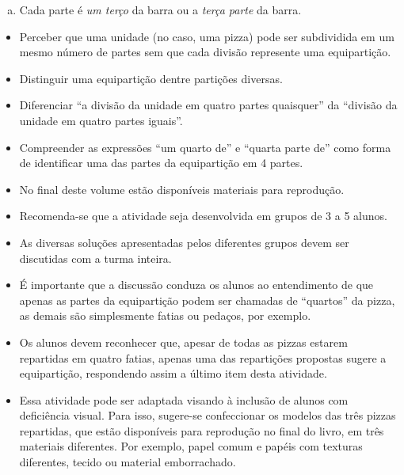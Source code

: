 \begin{multicols}{2}
\begin{solucao}{}{}
\begin{enumerate}[a),wide,labelindent=0pt]
    \item       Cada parte é {\it um terço} da barra ou a {\it terça parte} da barra.
\end{enumerate} %
\end{solucao}


\begin{objetivos}{}{}
\begin{itemize} %
    \item       Perceber que uma unidade (no caso, uma pizza) pode ser subdividida em um mesmo número de partes sem que cada divisão represente uma equipartição.
    \item       Distinguir uma equipartição dentre partições diversas.
    \item       Diferenciar       ``a divisão da unidade em quatro partes quaisquer'' da       ``divisão da unidade em quatro partes iguais''.
    \item       Compreender as expressões ``um quarto de'' e ``quarta parte de'' como forma de identificar uma das partes da equipartição em 4 partes.
\end{itemize} %
\end{objetivos}

\begin{orientacoes}
  \begin{itemize} %
    \item No final deste volume estão disponíveis materiais para reprodução.
    \item Recomenda-se que a atividade seja desenvolvida em grupos de 3 a 5 alunos.
    \item As diversas soluções apresentadas pelos diferentes grupos devem ser discutidas com a turma inteira.
    \item É importante que a discussão conduza os alunos ao entendimento de que apenas as partes da equipartição podem ser chamadas de ``quartos'' da pizza, as demais são simplesmente fatias ou pedaços, por exemplo.
    \item Os alunos devem reconhecer que, apesar de todas as pizzas estarem repartidas em quatro fatias, apenas uma das repartições propostas sugere a equipartição, respondendo assim a último item desta atividade.
    \item       Essa atividade pode ser adaptada visando à inclusão de alunos com deficiência visual. Para isso, sugere-se confeccionar os modelos das três pizzas repartidas, que estão disponíveis para reprodução no final do livro, em três materiais diferentes. Por exemplo, papel comum e papéis com texturas diferentes, tecido ou material emborrachado.
\end{itemize} %
\end{orientacoes}


\end{multicols}
